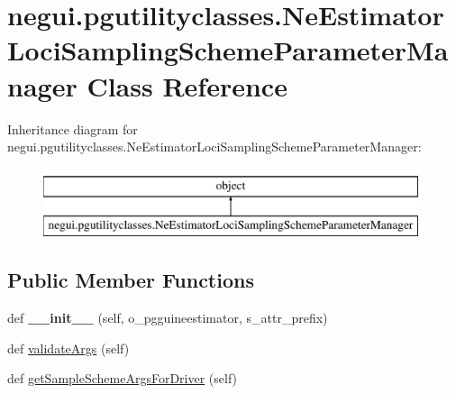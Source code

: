 \hypertarget{classnegui_1_1pgutilityclasses_1_1NeEstimatorLociSamplingSchemeParameterManager}{}\section{negui.\+pgutilityclasses.\+Ne\+Estimator\+Loci\+Sampling\+Scheme\+Parameter\+Manager Class Reference}
\label{classnegui_1_1pgutilityclasses_1_1NeEstimatorLociSamplingSchemeParameterManager}
Inheritance diagram for negui.\+pgutilityclasses.\+Ne\+Estimator\+Loci\+Sampling\+Scheme\+Parameter\+Manager\+:\begin{figure}[H]
\begin{center}
\leavevmode
\includegraphics[height=2.000000cm]{classnegui_1_1pgutilityclasses_1_1NeEstimatorLociSamplingSchemeParameterManager}
\end{center}
\end{figure}
\subsection*{Public Member Functions}
\begin{DoxyCompactItemize}
\item 
def {\bfseries \+\_\+\+\_\+init\+\_\+\+\_\+} (self, o\+\_\+pgguineestimator, s\+\_\+attr\+\_\+prefix)\hypertarget{classnegui_1_1pgutilityclasses_1_1NeEstimatorLociSamplingSchemeParameterManager_ad9e59192dcb0df54615057ed70a36e1e}{}\label{classnegui_1_1pgutilityclasses_1_1NeEstimatorLociSamplingSchemeParameterManager_ad9e59192dcb0df54615057ed70a36e1e}

\item 
def \hyperlink{classnegui_1_1pgutilityclasses_1_1NeEstimatorLociSamplingSchemeParameterManager_a6dd33d7bf346f1d75a3cfa67373d3276}{validate\+Args} (self)
\item 
def \hyperlink{classnegui_1_1pgutilityclasses_1_1NeEstimatorLociSamplingSchemeParameterManager_aee83e064c6363bad53e22be63ac24487}{get\+Sample\+Scheme\+Args\+For\+Driver} (self)
\end{DoxyCompactItemize}

